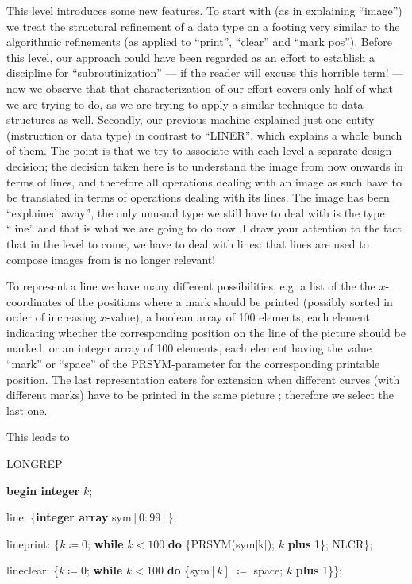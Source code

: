 This level introduces some new features. To start with (as in explaining ``image'') we treat the structural refinement of a data type on a footing very similar to the algorithmic refinements (as applied to ``print'', ``clear'' and ``mark pos''). Before this level, our approach could have been regarded as an effort to establish a discipline for ``subroutinization'' --- if the reader will excuse this horrible term! --- now we observe that that characterization of  our effort covers only half of what we are trying to do, as we are trying to apply a similar technique to data structures as well. Secondly, our previous machine explained just one entity (instruction or data type) in contrast to ``LINER'', which explains a whole bunch of them. The point is that we try to associate with each level a separate design decision; the decision taken here is to understand the image from now onwards in terms of lines, and therefore all operations dealing with an image as such have to be translated in terms of operations dealing with its lines. The image has been ``explained away'', the only unusual type we still have to deal with is the type ``line'' and that is what we are going to do now. I draw your attention to the fact that in the level to come, we have to deal with lines: that lines are used to compose images from is no longer relevant!

To represent a line we have many different possibilities, e.g. a list of the the $x$-coordinates of the positions where a mark should be printed (possibly sorted in order of increasing $x$-value), a boolean array of 100 elements, each element indicating whether the corresponding position on the line of the picture should be marked, or an integer array of 100 elements, each element having the value ``mark'' or ``space'' of the PRSYM-parameter for the corresponding printable position. The last representation caters for extension when different curves (with different marks) have to be printed in the same picture ; therefore we select the last one.

This leads to

\noindent
LONGREP

\noindent
\textbf{begin integer} $k$;

\noindent
\quad line: \{\textbf{integer array} sym$[0 : 99]$\};

\noindent
\quad lineprint: \{$k \coloneq 0$; \textbf{while} $k < 100$ \textbf{do} \{PRSYM(sym[k$]$); $k$ \textbf{plus} 1\}; NLCR\};

\noindent
\quad lineclear: \{$k \coloneq 0$; \textbf{while} $k < 100$ \textbf{do} \{sym$[k]$ $\coloneq$ space; $k$ \textbf{plus} 1\}\};

